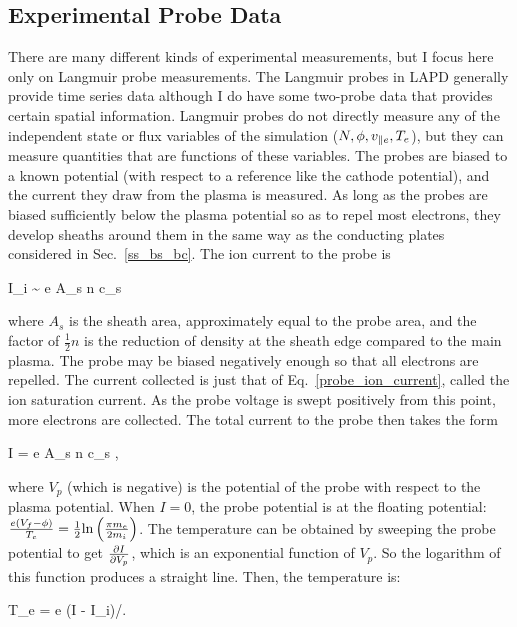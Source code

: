 \subsection{Experimental Probe Data}
\label{ss_probe_data}

There are many different kinds of experimental measurements, but I focus here only on Langmuir probe measurements. The Langmuir probes in LAPD generally provide time series data although
I do have some two-probe data that provides certain spatial information. Langmuir probes do not directly measure any of the independent state or flux variables of the simulation 
($N, \phi, v_{\parallel e}, T_e$), but they can measure quantities that are functions of these variables. The probes are biased to a known potential (with respect to a reference like the cathode potential),
and the current they draw from the plasma is measured. As long as the probes are biased sufficiently below the plasma potential so as to repel most electrons, 
they develop sheaths around them in the same way as the conducting plates considered in Sec.~\ref{ss_bs_bc}. The ion current to the probe is~\cite{hutchinson2002}

\beq
\label{probe_ion_current}
I_i \sim {} e A_s n c_s
\eeq

where $A_s$ is the sheath area, approximately equal to the probe area, and the factor of $\frac{1}{2} n$ is the reduction of density at the sheath edge compared to the main plasma.
The probe may be biased negatively enough so that all electrons are repelled. The current collected is just that of Eq.~\ref{probe_ion_current}, called the ion saturation current.
As the probe voltage is swept positively from this point, more electrons are collected. The total current to the probe then takes the form~\cite{hutchinson2002}

\beq
\label{probe_current}
I = e A_s n c_s ,
\eeq

where $V_p$ (which is negative) is the potential of the probe with respect to the plasma potential. When $I=0$, the probe potential is at the floating potential: 
$\frac{e (V_f - \phi)}{T_e} = \frac{1}{2} {\rm ln} \left(\frac{\pi m_e}{2 m_i}\right)$. The temperature can be obtained by sweeping the probe potential to get $\frac{\partial I}{\partial V_p}$, 
which is an exponential function of $V_p$.
So the logarithm of this function produces a straight line. Then, the temperature is:

\beq
\label{probe_temp}
T_e = e (I - I_i)/.
\eeq

